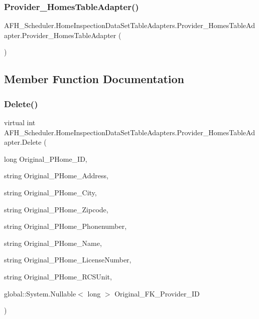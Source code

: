 \subsubsection{Provider\_HomesTableAdapter()}
{\footnotesize\ttfamily A\+F\+H\+\_\+\+Scheduler.\+Home\+Inspection\+Data\+Set\+Table\+Adapters.\+Provider\+\_\+\+Homes\+Table\+Adapter.\+Provider\+\_\+\+Homes\+Table\+Adapter (\begin{DoxyParamCaption}{ }\end{DoxyParamCaption})}



\subsection{Member Function Documentation}
\mbox{\label{class_a_f_h___scheduler_1_1_home_inspection_data_set_table_adapters_1_1_provider___homes_table_adapter_afdaf4e2216e448f1de8e5ba3cc64651c}} 
\subsubsection{Delete()}
{\footnotesize\ttfamily virtual int A\+F\+H\+\_\+\+Scheduler.\+Home\+Inspection\+Data\+Set\+Table\+Adapters.\+Provider\+\_\+\+Homes\+Table\+Adapter.\+Delete (\begin{DoxyParamCaption}\item[{long}]{Original\+\_\+\+P\+Home\+\_\+\+ID,  }\item[{string}]{Original\+\_\+\+P\+Home\+\_\+\+Address,  }\item[{string}]{Original\+\_\+\+P\+Home\+\_\+\+City,  }\item[{string}]{Original\+\_\+\+P\+Home\+\_\+\+Zipcode,  }\item[{string}]{Original\+\_\+\+P\+Home\+\_\+\+Phonenumber,  }\item[{string}]{Original\+\_\+\+P\+Home\+\_\+\+Name,  }\item[{string}]{Original\+\_\+\+P\+Home\+\_\+\+License\+Number,  }\item[{string}]{Original\+\_\+\+P\+Home\+\_\+\+R\+C\+S\+Unit,  }\item[{global\+::\+System.\+Nullable$<$ long $>$}]{Original\+\_\+\+F\+K\+\_\+\+Provider\+\_\+\+ID }\end{DoxyParamCaption})\hspace{0.3cm}{\ttfamily [virtual]}}

